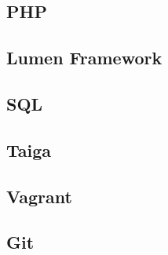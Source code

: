 \subsection{PHP}

\subsection{Lumen Framework}

\subsection{SQL}

\subsection{Taiga}

\subsection{Vagrant}

\subsection{Git}